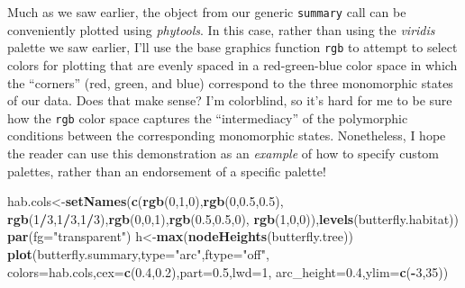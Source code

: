 \documentclass[fleqn,10pt,lineno]{wlpeerj} %
\newenvironment{Shaded}{\begin{snugshade}}{\end{snugshade}}
\newcommand{\AttributeTok}[1]{\textcolor[rgb]{0.13,0.29,0.53}{#1}}
\newcommand{\DecValTok}[1]{\textcolor[rgb]{0.00,0.00,0.81}{#1}}
\newcommand{\FloatTok}[1]{\textcolor[rgb]{0.00,0.00,0.81}{#1}}
\newcommand{\FunctionTok}[1]{\textcolor[rgb]{0.13,0.29,0.53}{\textbf{#1}}}
\newcommand{\NormalTok}[1]{#1}
\newcommand{\OtherTok}[1]{\textcolor[rgb]{0.56,0.35,0.01}{#1}}
\newcommand{\SpecialCharTok}[1]{\textcolor[rgb]{0.81,0.36,0.00}{\textbf{#1}}}
\newcommand{\StringTok}[1]{\textcolor[rgb]{0.31,0.60,0.02}{#1}}
\begin{document}
Much as we saw earlier, the object from our generic \texttt{summary} call can be conveniently plotted using \emph{phytools}. In this case, rather than using the \emph{viridis} palette we saw earlier, I'll use the base graphics function \texttt{rgb} to attempt to select colors for plotting that are evenly spaced in a red-green-blue color space in which the ``corners'' (red, green, and blue) correspond to the three monomorphic states of our data. Does that make sense? I'm colorblind, so it's hard for me to be sure how the \texttt{rgb} color space captures the ``intermediacy'' of the polymorphic conditions between the corresponding monomorphic states. Nonetheless, I hope the reader can use this demonstration as an \emph{example} of how to specify custom palettes, rather than an endorsement of a specific palette!

\begin{Shaded}
\begin{Highlighting}[]
\NormalTok{hab.cols}\OtherTok{\textless{}{-}}\FunctionTok{setNames}\NormalTok{(}\FunctionTok{c}\NormalTok{(}\FunctionTok{rgb}\NormalTok{(}\DecValTok{0}\NormalTok{,}\DecValTok{1}\NormalTok{,}\DecValTok{0}\NormalTok{),}\FunctionTok{rgb}\NormalTok{(}\DecValTok{0}\NormalTok{,}\FloatTok{0.5}\NormalTok{,}\FloatTok{0.5}\NormalTok{),}
  \FunctionTok{rgb}\NormalTok{(}\DecValTok{1}\SpecialCharTok{/}\DecValTok{3}\NormalTok{,}\DecValTok{1}\SpecialCharTok{/}\DecValTok{3}\NormalTok{,}\DecValTok{1}\SpecialCharTok{/}\DecValTok{3}\NormalTok{),}\FunctionTok{rgb}\NormalTok{(}\DecValTok{0}\NormalTok{,}\DecValTok{0}\NormalTok{,}\DecValTok{1}\NormalTok{),}\FunctionTok{rgb}\NormalTok{(}\FloatTok{0.5}\NormalTok{,}\FloatTok{0.5}\NormalTok{,}\DecValTok{0}\NormalTok{),}
  \FunctionTok{rgb}\NormalTok{(}\DecValTok{1}\NormalTok{,}\DecValTok{0}\NormalTok{,}\DecValTok{0}\NormalTok{)),}\FunctionTok{levels}\NormalTok{(butterfly.habitat))}
\FunctionTok{par}\NormalTok{(}\AttributeTok{fg=}\StringTok{"transparent"}\NormalTok{)}
\NormalTok{h}\OtherTok{\textless{}{-}}\FunctionTok{max}\NormalTok{(}\FunctionTok{nodeHeights}\NormalTok{(butterfly.tree))}
\FunctionTok{plot}\NormalTok{(butterfly.summary,}\AttributeTok{type=}\StringTok{"arc"}\NormalTok{,}\AttributeTok{ftype=}\StringTok{"off"}\NormalTok{,}
  \AttributeTok{colors=}\NormalTok{hab.cols,}\AttributeTok{cex=}\FunctionTok{c}\NormalTok{(}\FloatTok{0.4}\NormalTok{,}\FloatTok{0.2}\NormalTok{),}\AttributeTok{part=}\FloatTok{0.5}\NormalTok{,}\AttributeTok{lwd=}\DecValTok{1}\NormalTok{,}
  \AttributeTok{arc\_height=}\FloatTok{0.4}\NormalTok{,}\AttributeTok{ylim=}\FunctionTok{c}\NormalTok{(}\SpecialCharTok{{-}}\DecValTok{3}\NormalTok{,}\DecValTok{35}\NormalTok{))}

\end{Highlighting}
\end{Shaded}
\end{document}
